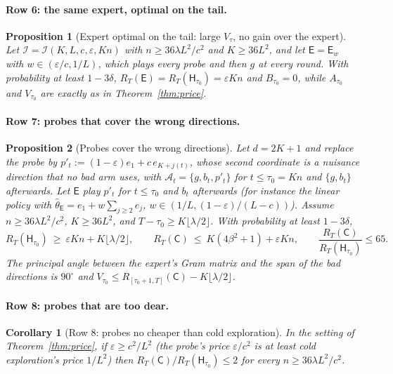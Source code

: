 \documentclass{article}
\newtheorem{proposition}{Proposition}
\newtheorem{corollary}{Corollary}
\theoremstyle{definition}
\theoremstyle{remark}
\newcommand{\eps}{\varepsilon}
\theoremstyle{remark}
\newcommand{\Cold}{\mathsf{C}}
\newcommand{\Exp}{\mathsf{E}}
\newcommand{\Hyb}{\mathsf{H}}
\begin{document}
\paragraph{Row 6: the same expert, optimal on the tail.}
\begin{proposition}[Expert optimal on the tail: large $V_\tau$, no gain over the expert]
\label{prop:cat-tail}
Let $\mathcal I=\mathcal I(K,L,c,\eps,Kn)$ with $n\ge36\lambda L^2/c^2$ and
$K\ge36L^2$, and let $\Exp=\Exp_w$ with $w\in(\eps/c,1/L)$, which plays every
probe and then $g$ at every round. With probability at least $1-3\delta$,
$R_T(\Exp)=R_T(\Hyb_{\tau_0})=\eps Kn$ and $B_{\tau_0}=0$, while $A_{\tau_0}$
and $V_{\tau_0}$ are exactly as in Theorem~\ref{thm:price}.
\end{proposition}

\paragraph{Row 7: probes that cover the wrong directions.}
\begin{proposition}[Probes cover the wrong directions]
\label{prop:cat-wrong}
Let $d=2K+1$ and replace the probe by
$p'_t:=(1-\eps)e_1+c\,e_{K+j(t)}$, whose second coordinate is a nuisance
direction that no bad arm uses, with $\mathcal A_t=\{g,b_t,p'_t\}$ for
$t\le\tau_0=Kn$ and $\{g,b_t\}$ afterwards. Let $\Exp$ play $p'_t$ for
$t\le\tau_0$ and $b_t$ afterwards (for instance the linear policy with
$\widehat\theta_{\Exp}=e_1+w\sum_{j\ge2}e_j$, $w\in(1/L,(1-\eps)/(L-c))$).
Assume $n\ge36\lambda L^2/c^2$, $K\ge36L^2$, and $T-\tau_0\ge K\lfloor\lambda/2\rfloor$.
With probability at least $1-3\delta$,
\[
R_T(\Hyb_{\tau_0})\ \ge\ \eps Kn+K\lfloor\lambda/2\rfloor,
\qquad
R_T(\Cold)\ \le\ K(4\beta^2+1)+\eps Kn,
\qquad
\frac{R_T(\Cold)}{R_T(\Hyb_{\tau_0})}\le65 .
\]
The principal angle between the expert's Gram matrix and the span of the bad
directions is $90^\circ$ and $V_{\tau_0}\le R_{[\tau_0+1,T]}(\Cold)-K\lfloor\lambda/2\rfloor$.
\end{proposition}

\paragraph{Row 8: probes that are too dear.}
\begin{corollary}[Row 8: probes no cheaper than cold exploration]
\label{cor:cat-dear}
In the setting of Theorem~\ref{thm:price}, if $\eps\ge c^2/L^2$ (the probe's
price $\eps/c^2$ is at least cold exploration's price $1/L^2$) then
$R_T(\Cold)/R_T(\Hyb_{\tau_0})\le2$ for every $n\ge36\lambda L^2/c^2$.
\end{corollary}
\end{document}
